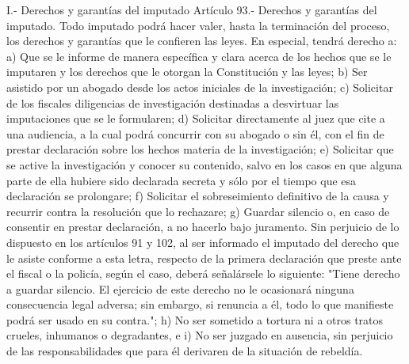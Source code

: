     I.- Derechos y garantías del imputado
    Artículo 93.- Derechos y garantías del imputado. Todo imputado podrá hacer valer, hasta la terminación del proceso, los derechos y garantías que le confieren las leyes.
    En especial, tendrá derecho a:
    a) Que se le informe de manera específica y clara acerca de los hechos que se le imputaren y los derechos que le otorgan la Constitución y las leyes;
    b) Ser asistido por un abogado desde los actos iniciales de la investigación;
    c) Solicitar de los fiscales diligencias de investigación destinadas a desvirtuar las imputaciones que se le formularen;
    d) Solicitar directamente al juez que cite a una audiencia, a la cual podrá concurrir con su abogado o sin él, con el fin de prestar declaración sobre los hechos materia de la investigación;
    e) Solicitar que se active la investigación y conocer su contenido, salvo en los casos en que alguna parte de ella hubiere sido declarada secreta y sólo por el tiempo que esa declaración se prolongare;
    f) Solicitar el sobreseimiento definitivo de la causa y recurrir contra la resolución que lo rechazare;
    g) Guardar silencio o, en caso de consentir en prestar declaración, a no hacerlo bajo juramento. Sin perjuicio de lo dispuesto en los artículos 91 y 102, al ser informado el imputado del derecho que le asiste conforme a esta letra, respecto de la primera declaración que preste ante el fiscal o la policía, según el caso, deberá señalársele lo siguiente: "Tiene derecho a guardar silencio. El ejercicio de este derecho no le ocasionará ninguna consecuencia legal adversa; sin embargo, si renuncia a él, todo lo que manifieste podrá ser usado en su contra.";
    h) No ser sometido a tortura ni a otros tratos crueles, inhumanos o degradantes, e
    i) No ser juzgado en ausencia, sin perjuicio de las responsabilidades que para él derivaren de la situación de rebeldía.

